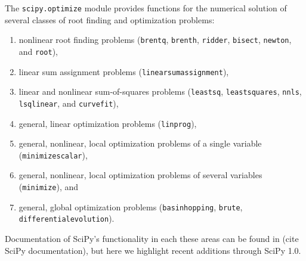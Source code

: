 \newcommand{\RR}{\ensuremath{\mathbb{R}}}
The \texttt{scipy.optimize} module provides functions for the numerical solution of several classes of root finding and optimization problems:
\begin{enumerate}
\item nonlinear root finding problems (\texttt{brentq}, \texttt{brenth}, \texttt{ridder}, \texttt{bisect}, \texttt{newton}, and \texttt{root}),
\item linear sum assignment problems (\texttt{linear\textunderscore sum\textunderscore assignment}),
\item linear and nonlinear sum-of-squares problems (\texttt{leastsq}, \texttt{least\textunderscore squares}, \texttt{nnls}, \texttt{lsq\textunderscore linear}, and \texttt{curve\textunderscore fit}),
\item general, linear optimization problems (\texttt{linprog}),
\item general, nonlinear, local optimization problems of a single variable (\texttt{minimize\textunderscore scalar}),
\item general, nonlinear, local optimization problems of several variables (\texttt{minimize}), and
\item general, global optimization problems (\texttt{basinhopping}, \texttt{brute}, \texttt{differential\textunderscore evolution}).
\end{enumerate}
Documentation of SciPy's functionality in each these areas can be found in (cite SciPy documentation), but here we highlight recent additions through SciPy 1.0.



